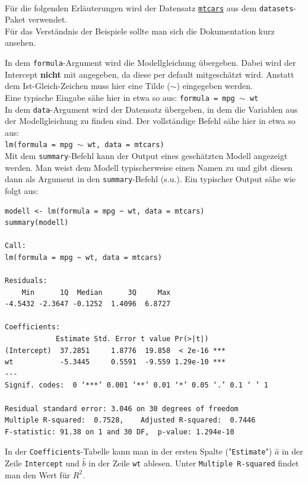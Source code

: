 \documentclass[a4paper]{article}
\newcommand\dangersign{%
 \makebox[1.8em][c]{%
 \makebox[0pt][c]{\raisebox{.15em}{\small!}}%
 \makebox[0pt][c]{\color{red}\Large$\triangle$}}}%
\begin{document}
\clearpage

\noindent {}\\

\noindent Für die folgenden Erläuterungen wird der Datensatz \href{https://www.rdocumentation.org/packages/datasets/versions/3.6.2/topics/mtcars}{\texttt{mtcars}} aus dem \texttt{datasets}-Paket verwendet.\\Für das Verständnis der Beispiele sollte man sich die Dokumentation kurz ansehen.

\noindent \dangersign In dem \texttt{formula}-Argument wird die Modellgleichung übergeben. Dabei wird der Intercept \textbf{nicht} mit angegeben, da diese per default mitgeschätzt wird. Anstatt dem Ist-Gleich-Zeichen muss hier eine Tilde ($\sim$) eingegeben werden.\\
Eine typische Eingabe sähe hier in etwa so aus:
\texttt{formula = mpg $\sim$ wt}\\

\noindent \dangersign In dem \texttt{data}-Argument wird der Datensatz übergeben, in dem die Variablen aus der Modellgleichung zu finden sind. Der vollständige Befehl sähe hier in etwa so aus:\\
\texttt{lm(formula = mpg $\sim$ wt, data = mtcars)}\\

\noindent \dangersign Mit dem \texttt{summary}-Befehl kann der Output eines geschätzten Modell angezeigt werden. Man weist dem Modell typischerweise einen Namen zu und gibt diesen dann als Argument in den \texttt{summary}-Befehl (s.u.). Ein typischer Output sähe wie folgt aus:\\

\begin{small}
\begin{Verbatim}[frame=single]
modell <- lm(formula = mpg ~ wt, data = mtcars)
summary(modell)

Call:
lm(formula = mpg ~ wt, data = mtcars)

Residuals:
    Min      1Q  Median      3Q     Max 
-4.5432 -2.3647 -0.1252  1.4096  6.8727 

Coefficients:
            Estimate Std. Error t value Pr(>|t|)    
(Intercept)  37.2851     1.8776  19.858  < 2e-16 ***
wt           -5.3445     0.5591  -9.559 1.29e-10 ***
---
Signif. codes:  0 ‘***’ 0.001 ‘**’ 0.01 ‘*’ 0.05 ‘.’ 0.1 ‘ ’ 1

Residual standard error: 3.046 on 30 degrees of freedom
Multiple R-squared:  0.7528,	Adjusted R-squared:  0.7446 
F-statistic: 91.38 on 1 and 30 DF,  p-value: 1.294e-10
\end{Verbatim}
\end{small}
In der \texttt{Coefficients}-Tabelle kann man in der ersten Spalte ("\texttt{Estimate}") $\hat a$ in der Zeile \texttt{Intercept} und $\hat b$ in der Zeile \texttt{wt} ablesen. Unter \texttt{Multiple R-squared} findet man den Wert für $R^2$.\\
\end{document}
